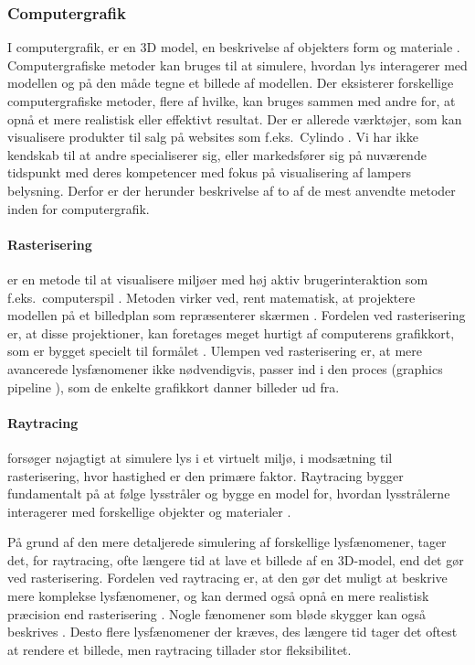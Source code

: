 \subsubsection{Computergrafik}
\label{sec:computergrafik}
I computergrafik, er en 3D model, en beskrivelse af objekters form og materiale \cite{computergrafik_introduktion}. Computergrafiske metoder kan bruges til at simulere, hvordan lys interagerer med modellen og på den måde tegne et billede af modellen. Der eksisterer forskellige computergrafiske metoder, flere af hvilke, kan bruges sammen med andre for, at opnå et mere realistisk eller effektivt resultat. Der er allerede værktøjer, som kan visualisere produkter til salg på websites som f.eks.\ Cylindo \cite{Cylindo}. Vi har ikke kendskab til at andre specialiserer sig, eller markedsfører sig på nuværende tidspunkt med deres kompetencer med fokus på visualisering af lampers belysning. Derfor er der herunder beskrivelse af to af de mest anvendte metoder inden for computergrafik.

\paragraph{Rasterisering}
er en metode til at visualisere miljøer med høj aktiv brugerinteraktion som f.eks.\ computerspil \cite{rastarization}. Metoden virker ved, rent matematisk, at projektere modellen på et billedplan som repræsenterer skærmen \cite{rastarization}. Fordelen ved rasterisering er, at disse projektioner, kan foretages meget hurtigt af computerens grafikkort, som er bygget specielt til formålet \cite{rastarization}. Ulempen ved rasterisering er, at mere avancerede lysfænomener ikke nødvendigvis, passer ind i den proces (graphics pipeline \cite{rastarization}), som de enkelte grafikkort danner billeder ud fra. 

\paragraph{Raytracing} forsøger nøjagtigt at simulere lys i et virtuelt miljø, i modsætning til rasterisering, hvor hastighed er den primære faktor. Raytracing bygger fundamentalt på at følge lysstråler og bygge en model for, hvordan lysstrålerne interagerer med forskellige objekter og materialer \cite{raytracing_for_begyndere}. 

På grund af den mere detaljerede simulering af forskellige lysfænomener, tager det, for raytracing, ofte længere tid at lave et billede af en 3D-model, end det gør ved rasterisering. Fordelen ved raytracing er, at den gør det muligt at beskrive mere komplekse lysfænomener, og kan dermed også opnå en mere realistisk præcision end rasterisering \cite{raytracingvsrastarizatioin}. Nogle fænomener som bløde skygger kan også beskrives \cite{softshadow}. Desto flere lysfænomener der kræves, des længere tid tager det oftest at rendere et billede, men raytracing tillader stor fleksibilitet.